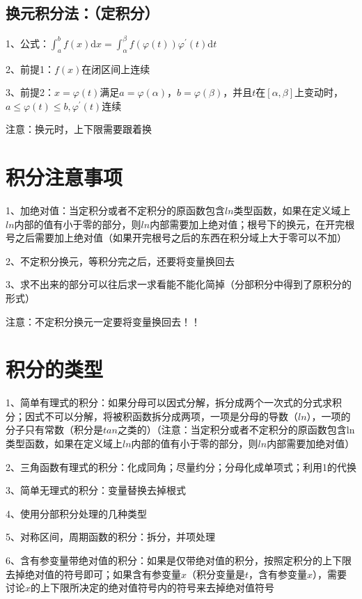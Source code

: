 \subsection{换元积分法：（定积分）}

1、公式：$\int_{a}^{b} f(x) \mathrm{d} x=\int_{\alpha}^{\beta} f(\varphi(t)) \varphi^{\prime}(t) \mathrm{d} t$

2、前提1：$f(x)$在闭区间上连续

3、前提2：$x=\varphi(t)$满足$a=\varphi(\alpha)$，$b=\varphi(\beta)$，并且$t$在$[{\alpha},{\beta}]$上变动时，$a \leqslant \varphi(t) \leqslant b, \varphi^{\prime}(t)$连续

注意：换元时，上下限需要跟着换

\section{积分注意事项}

1、加绝对值：当定积分或者不定积分的原函数包含$ln$类型函数，如果在定义域上$ln$内部的值有小于零的部分，则$ln$内部需要加上绝对值；根号下的换元，在开完根号之后需要加上绝对值（如果开完根号之后的东西在积分域上大于零可以不加）

2、不定积分换元，等积分完之后，还要将变量换回去

3、求不出来的部分可以往后求一求看能不能化简掉（分部积分中得到了原积分的形式）

注意：不定积分换元一定要将变量换回去！！

\section{积分的类型}

1、简单有理式的积分：如果分母可以因式分解，拆分成两个一次式的分式求积分；因式不可以分解，将被积函数拆分成两项，一项是分母的导数（$ln$），一项的分子只有常数（积分是$tan$之类的）（注意：当定积分或者不定积分的原函数包含ln类型函数，如果在定义域上$ln$内部的值有小于零的部分，则$ln$内部需要加绝对值）

2、三角函数有理式的积分：化成同角；尽量约分；分母化成单项式；利用1的代换

3、简单无理式的积分：变量替换去掉根式

4、使用分部积分处理的几种类型

5、对称区间，周期函数的积分：拆分，并项处理

6、含有参变量带绝对值的积分：如果是仅带绝对值的积分，按照定积分的上下限去掉绝对值的符号即可；如果含有参变量$x$（积分变量是$t$，含有参变量$x$），需要讨论$x$的上下限所决定的绝对值符号内的符号来去掉绝对值符号

